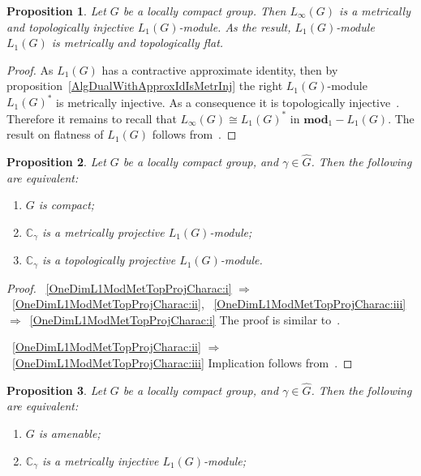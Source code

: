 \documentclass{article}
\theoremstyle{plain}
\newtheorem{proposition}{Proposition}[section]
\theoremstyle{definition}
\newtheorem{proof}{Proof}\def\theproof{}
\newcommand{\isom}{\mathop{\mathbin{\cong}}}
\begin{document}
\begin{fulltext}
\begin{proposition}\label{LInfIsL1MetrInj} Let $G$ be a locally compact group.
Then $L_\infty(G)$ is a metrically and topologically injective $L_1(G)$-module.
As the result, $L_1(G)$-module $L_1(G)$ is metrically and topologically flat.
\end{proposition}
\begin{proof} As $L_1(G)$ has a contractive approximate identity, then by
proposition~\ref{AlgDualWithApproxIdIsMetrInj} the right $L_1(G)$-module
${L_1(G)}^*$ is metrically injective. As a consequence it is topologically
injective~\cite[proposition 2.14]{NemGeomProjInjFlatBanMod}. Therefore it
remains to recall that $L_\infty(G)\isom {L_1(G)}^*$ in $\mathbf{mod}_1-L_1(G)$.
The result on flatness of $L_1(G)$ follows from~\cite[proposition
2.21]{NemGeomProjInjFlatBanMod}.
\end{proof}

\begin{proposition}\label{OneDimL1ModMetTopProjCharac} Let $G$ be a locally
compact group, and $\gamma\in\widehat{G}$. Then the following are equivalent:
\begin{enumerate}[label = (\roman*)]
    \item $G$ is compact;\label{OneDimL1ModMetTopProjCharac:i}
 
    \item $\mathbb{C}_\gamma$ is a metrically projective
    $L_1(G)$-module;\label{OneDimL1ModMetTopProjCharac:ii}
 
    \item $\mathbb{C}_\gamma$ is a topologically projective
    $L_1(G)$-module.\label{OneDimL1ModMetTopProjCharac:iii}
\end{enumerate}
\end{proposition}
\begin{proof}~\ref{OneDimL1ModMetTopProjCharac:i}
$\Longrightarrow$~\ref{OneDimL1ModMetTopProjCharac:ii},
~\ref{OneDimL1ModMetTopProjCharac:iii}
$\Longrightarrow$~\ref{OneDimL1ModMetTopProjCharac:i} The proof is similar
to~\cite[theorem 4.2]{GravInjProjBanMod}. 

~\ref{OneDimL1ModMetTopProjCharac:ii}
$\Longrightarrow$~\ref{OneDimL1ModMetTopProjCharac:iii} Implication follows
from~\cite[proposition 2.4]{NemGeomProjInjFlatBanMod}.
\end{proof}

\begin{proposition}\label{OneDimL1ModMetTopInjFlatCharac} Let $G$ be a locally
compact group, and $\gamma\in\widehat{G}$. Then the following are equivalent:
\begin{enumerate}[label = (\roman*)]
    \item $G$ is amenable;\label{OneDimL1ModMetTopInjFlatCharac:i}
    \item $\mathbb{C}_\gamma$ is a metrically injective 
    $L_1(G)$-module;\label{OneDimL1ModMetTopInjFlatCharac:ii}
 

\end{enumerate}
\end{proposition}
\end{fulltext}
\end{document}

